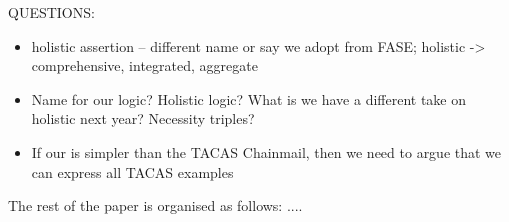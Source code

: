  QUESTIONS:
 \begin{itemize}
 \item
 holistic assertion -- different name or say we adopt from FASE; holistic -> comprehensive, integrated, aggregate
 \item
 Name for our logic?  Holistic logic? What is we have a different take on holistic next year? Necessity triples?
\item
If our \Chainmail is simpler than the TACAS Chainmail, then we need to argue that we can express all TACAS examples
 \end{itemize}
  
The rest of the paper is organised as follows: .... 

